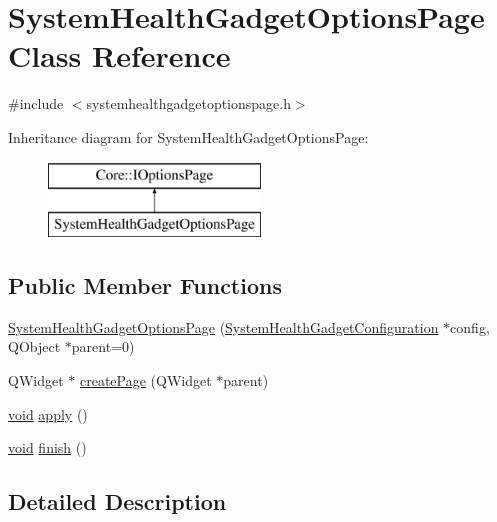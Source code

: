 \hypertarget{class_system_health_gadget_options_page}{\section{\-System\-Health\-Gadget\-Options\-Page \-Class \-Reference}
\label{class_system_health_gadget_options_page}
}


{\ttfamily \#include $<$systemhealthgadgetoptionspage.\-h$>$}

\-Inheritance diagram for \-System\-Health\-Gadget\-Options\-Page\-:\begin{figure}[H]
\begin{center}
\leavevmode
\includegraphics[height=2.000000cm]{class_system_health_gadget_options_page}
\end{center}
\end{figure}
\subsection*{\-Public \-Member \-Functions}
\begin{DoxyCompactItemize}
\item 
\hyperlink{group___system_health_plugin_gaa498d06c1c8158466c564b455b1044dc}{\-System\-Health\-Gadget\-Options\-Page} (\hyperlink{class_system_health_gadget_configuration}{\-System\-Health\-Gadget\-Configuration} $\ast$config, \-Q\-Object $\ast$parent=0)
\item 
\-Q\-Widget $\ast$ \hyperlink{group___system_health_plugin_ga6ac5a910e1fb73f88186c7602a7425b0}{create\-Page} (\-Q\-Widget $\ast$parent)
\item 
\hyperlink{group___u_a_v_objects_plugin_ga444cf2ff3f0ecbe028adce838d373f5c}{void} \hyperlink{group___system_health_plugin_gaff59ee5d1057c119bc98e72b972cdc77}{apply} ()
\item 
\hyperlink{group___u_a_v_objects_plugin_ga444cf2ff3f0ecbe028adce838d373f5c}{void} \hyperlink{group___system_health_plugin_gabcd1e79513ea408e8c9c6ab98baf6d7f}{finish} ()
\end{DoxyCompactItemize}


\subsection{\-Detailed \-Description}


